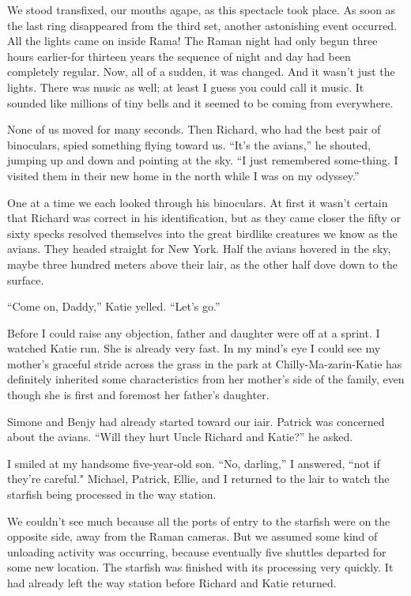 \documentclass[]{article}
\begin{document}
{We stood transfixed, our mouths agape, as this spectacle took place.  As soon as the last ring disappeared from the third set, another astonishing event occurred.  All the lights came on inside Rama! The Raman night had only begun three hours earlier-for thirteen years the sequence of night and day had been completely regular.  Now, all of a sudden, it was changed.  And it wasn’t just the lights.  There was music as well; at least I guess you could call it music.  It sounded like millions of tiny bells and it seemed to be coming from everywhere.

None of us moved for many seconds.  Then Richard, who had the best pair of binoculars, spied something flying toward us.  “It’s the avians,” he shouted, jumping up and down and pointing at the sky.  “I just remembered some-thing.  I visited them in their new home in the north while I was on my odyssey.”

One at a time we each looked through his binoculars.  At first it wasn’t certain that Richard was correct in his identification, but as they came closer the fifty or sixty specks resolved themselves into the great birdlike creatures we know as the avians.  They headed straight for New York.  Half the avians hovered in the sky, maybe three hundred meters above their lair, as the other half dove down to the surface.

“Come on, Daddy,” Katie yelled.  “Let’s go.”

Before I could raise any objection, father and daughter were off at a sprint.  I watched Katie run.  She is already very fast.  In my mind’s eye I could see my mother’s graceful stride across the grass in the park at Chilly-Ma-zarin-Katie has definitely inherited some characteristics from her mother’s side of the family, even though she is first and foremost her father’s daughter.

Simone and Benjy had already started toward our iair.  Patrick was concerned about the avians.  “Will they hurt Uncle Richard and Katie?” he asked.

I smiled at my handsome five-year-old son.  “No, darling,” I answered, “not if they’re careful."  Michael, Patrick, Ellie, and I returned to the lair to watch the starfish being processed in the way station.

We couldn’t see much because all the ports of entry to the starfish were on the opposite side, away from the Raman cameras.  But we assumed some kind of unloading activity was occurring, because eventually five shuttles departed for some new location.  The starfish was finished with its processing very quickly.  It had already left the way station before Richard and Katie returned.

}
\end{document}

